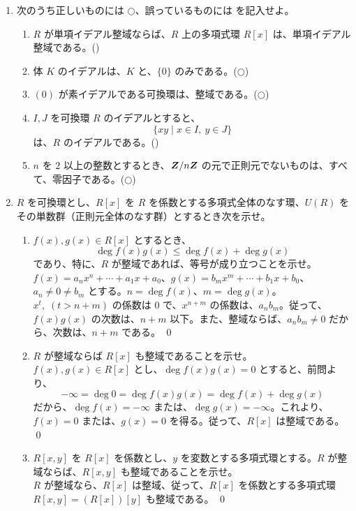 \begin{enumerate}
\item 次のうち正しいものには $\bigcirc$、誤っているものには \bigx を記入せよ。
     \begin{enumerate}
     \item $R$ が単項イデアル整域ならば、$R$ 上の多項式環 $R[x]$ は、単項イデアル整域である。\hfill (\bigx)
     \item 体 $K$ のイデアルは、$K$ と、$\{0\}$ のみである。\hfill($\bigcirc$)
     \item $(0)$ が素イデアルである可換環は、整域である。\hfill($\bigcirc$)
     \item $I, J$ を可換環 $R$ のイデアルとすると、
     $$\{xy\mid x\in I, \:y\in J\}$$
     は、$R$ のイデアルである。\hfill (\bigx)
     \item $n$ を $2$ 以上の整数とするとき、$\mbox{\boldmath $Z$}/n\mbox{\boldmath $Z$}$ の元で正則元でないものは、すべて、零因子である。\hfill($\bigcirc$)
     \end{enumerate}

\newpage
\item $R$ を可換環とし、$R[x]$ を $R$ を係数とする多項式全体のなす環、$U(R)$ をその単数群（正則元全体のなす群）とするとき次を示せ。
     \begin{enumerate}
     \item $f(x), g(x)\in R[x]$ とするとき、
     $$\deg f(x)g(x) \leq \deg f(x) + \deg g(x)$$
     であり、特に、$R$ が整域であれば、等号が成り立つことを示せ。\\
     \sol
     $f(x) = a_nx^n + \cdots + a_1x + a_0$、$g(x) = b_mx^m + \cdots + b_1x + b_0$、$a_n\neq 0 \neq b_m$ とする。$n = \deg f(x)$、$m = \deg g(x)$。$x^t, \;(t>n+m)$ の係数は 0 で、$x^{n+m}$ の係数は、$a_nb_m$。従って、$f(x)g(x)$ の次数は、$n+m$ 以下。また、整域ならば、$a_nb_m\neq 0$ だから、次数は、$n+m$ である。
     \qed
     
     \item $R$ が整域ならば $R[x]$ も整域であることを示せ。\\
     \sol
     $f(x), g(x)\in R[x]$ とし、$\deg f(x)g(x) = 0$ とすると、前問より、
     $$-\infty = \deg 0 = \deg f(x)g(x) = \deg f(x) + \deg g(x)$$
     だから、$\deg f(x) = -\infty$ または、$\deg g(x) = -\infty$。これより、$f(x) = 0$ または、$g(x) = 0$ を得る。従って、$R[x]$ は整域である。
     \qed
     
     \item $R[x,y]$ を $R[x]$ を係数とし、$y$ を変数とする多項式環とする。$R$ が整域ならば、$R[x,y]$ も整域であることを示せ。\\
     \sol
     $R$ が整域なら、$R[x]$ は整域、従って、$R[x]$ を係数とする多項式環 $R[x,y] = (R[x])[y]$ も整域である。
     \qed
     

\end{enumerate}
\end{enumerate}
